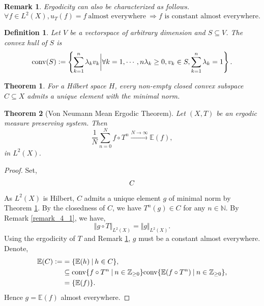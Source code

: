 \documentclass[8pt]{article}
\newtheorem{theorem}{Theorem} [section]
\newtheorem{definition}{Definition}[section]
\newtheorem{remark}{Remark}[section]
\newcommand{\alev}[0]{\:\text{almost everywhere}\:}
\newcommand{\norm}[1]{\Vert #1 \Vert}
\newcommand{\sep}[0]{\:\vert\:}
\newcommand{\defeq}{\vcentcolon=}
\newcommand{\bN}[0]{\mathbb{N}}
\newcommand{\bZ}[0]{\mathbb{Z}}
\newcommand{\conv}[0]{\mathrm{conv}}
\begin{document}
\begin{remark}
  \label{remark_4_2}
  Ergodicity can also be characterized as follows. 
  \begin{equation*}
    \forall f\in L^2(X), u_T(f)=f\alev\Rightarrow f\text{ is constant almost everywhere}.
  \end{equation*}
\end{remark}

\begin{definition}
  \label{defintion_4_4}
  Let $V$ be a vectorspace of arbitrary dimension and $S\subseteq V$. The convex hull of $S$ is 
  \begin{equation*}
    \conv(S)\defeq\left\{\sum_{k=1}^n \lambda_k v_k\bigg{\vert}\forall k=1,\cdots,n \lambda_k \geq0,v_k\in S,\sum_{k=1}^n\lambda_k = 1\right\}.
  \end{equation*}
\end{definition}

\begin{theorem}
  \label{theorem_4_1}
  For a Hilbert space $H$, every non-empty closed convex subspace $C\subseteq X$ admits a unique element with the minimal norm.
\end{theorem}

\begin{theorem}[Von Neumann Mean Ergodic Theorem]
  \label{theorem_4_2}
  Let $(X,T)$ be an ergodic measure preserving system. Then 
  \begin{equation*}
    {\frac 1 N}\sum_{n=0}^N f\circ T^n\stackrel{N\to\infty}{\to}\mathbb{E}(f),
  \end{equation*}
  in $L^2(X)$. 
\end{theorem}

\begin{proof}
  Set,
  \begin{equation*}
    C \def \overline{\conv\{f\circ T^n\sep n\in\bZ_{\geq0}\}}
  \end{equation*}
  As $L^2(X)$ is Hilbert, $C$ admits a unique element $g$ of minimal norm by Theorem \ref{theorem_4_1}.
  By the closedness of $C$, we have $T^n(g)\in C$ for any $n\in\bN$. By Remark \ref{remark_4_1}, we have,
  \begin{equation*}
    \norm{g\circ T}_{L^2(X)} = \norm{g}_{L^2(X)}.
  \end{equation*} 
  Using the ergodicity of $T$ and Remark \ref{remark_4_2}, $g$ must be a constant almost everywhere.
  Denote,
  \begin{align*}
    \mathbb{E}(C)\defeq &= \{\mathbb{E}(h)\sep h\in C\},\\
    & \subseteq \overline{\conv\{\mathbb{E}(f\circ T^n)\sep n\in\bZ_{\geq0}\}},\\
    & = \{\mathbb{E}(f)\}.
  \end{align*}
  Hence $g = \mathbb{E}(f)$ almost everywhere.
\end{proof}
\end{document}
